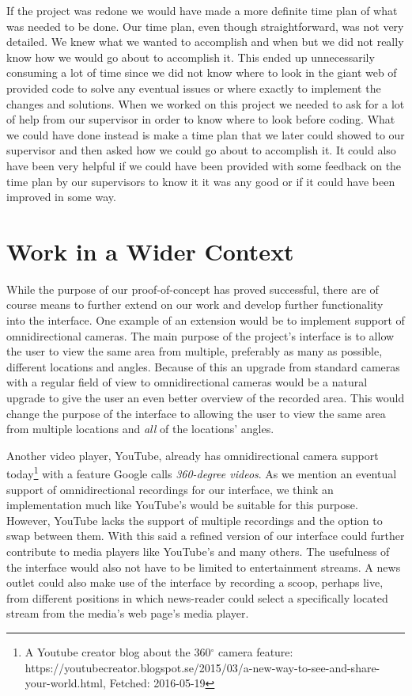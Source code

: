 If the project was redone we would have made a more definite time plan of what was needed to be done. Our time plan, even though straightforward, was not very detailed. We knew what we wanted to accomplish and when but we did not really know how we would go about to accomplish it. This ended up unnecessarily consuming a lot of time since we did not know where to look in the giant web of provided code to solve any eventual issues or where exactly to implement the changes and solutions. When we worked on this project we needed to ask for a lot of help from our supervisor in order to know where to look before coding. What we could have done instead is make a time plan that we later could showed to our supervisor and then asked how we could go about to accomplish it. It could also have been very helpful if we could have been provided with some feedback on the time plan by our supervisors to know it it was any good or if it could have been improved in some way. 

\section{Work in a Wider Context}
\label{sec:workinawidercontext}
While the purpose of our proof-of-concept has proved successful, there are of course means to further extend on our work and develop further functionality into the interface. One example of an extension would be to implement support of omnidirectional cameras. The main purpose of the project's interface is to allow the user to view the same area from multiple, preferably as many as possible, different locations and angles. Because of this an upgrade from standard cameras with a regular field of view to omnidirectional cameras would be a natural upgrade to give the user an even better overview of the recorded area. This would change the purpose of the interface to allowing the user to view the same area from multiple locations and \textit{all} of the locations' angles.

Another video player, YouTube, already has omnidirectional camera support today\footnote{A Youtube creator blog about the 360$^{\circ}$ camera feature: https://youtubecreator.blogspot.se/2015/03/a-new-way-to-see-and-share-your-world.html, Fetched: 2016-05-19} with a feature Google calls \textit{360-degree videos}. As we mention an eventual support of omnidirectional recordings for our interface, we think an implementation much like YouTube's would be suitable for this purpose. However, YouTube lacks the support of multiple recordings and the option to swap between them. With this said a refined version of our interface could further contribute to media players like YouTube's and many others. The usefulness of the interface would also not have to be limited to entertainment streams. A news outlet could also make use of the interface by recording a scoop, perhaps live, from different positions in which news-reader could select a specifically located stream from the media's web page's media player.

